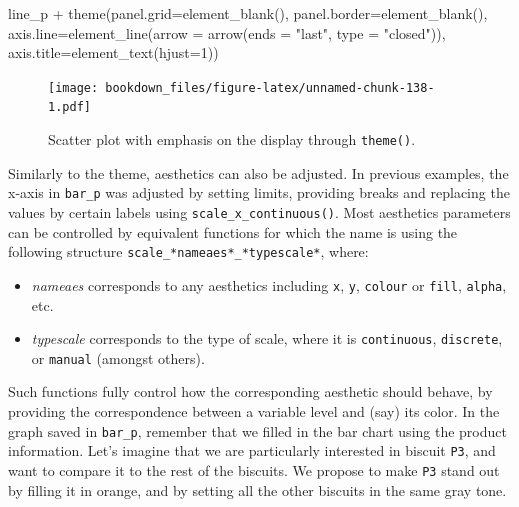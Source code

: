 \documentclass[
]{krantz}
\makeatletter
\newenvironment{Shaded}{\begin{snugshade}}{\end{snugshade}}
\newcommand{\AttributeTok}[1]{\textcolor[rgb]{0.61,0.61,0.61}{#1}}
\newcommand{\DecValTok}[1]{\textcolor[rgb]{0.06,0.06,0.06}{#1}}
\newcommand{\FunctionTok}[1]{\textcolor[rgb]{0,0,0}{#1}}
\newcommand{\NormalTok}[1]{#1}
\newcommand{\SpecialCharTok}[1]{\textcolor[rgb]{0,0,0}{#1}}
\newcommand{\StringTok}[1]{\textcolor[rgb]{0.5,0.5,0.5}{#1}}
\providecommand{\tightlist}{%
  \setlength{\itemsep}{0pt}\setlength{\parskip}{0pt}}
\newenvironment{kframe}{%
\medskip{}
\setlength{\fboxsep}{.8em}
 \def\at@end@of@kframe{}%
 \ifinner\ifhmode%
  \def\at@end@of@kframe{\end{minipage}}%
  \begin{minipage}{\columnwidth}%
 \fi\fi%
 \def\FrameCommand##1{\hskip\@totalleftmargin \hskip-\fboxsep
 \colorbox{shadecolor}{##1}\hskip-\fboxsep
     \hskip-\linewidth \hskip-\@totalleftmargin \hskip\columnwidth}%
 \MakeFramed {\advance\hsize-\width
   \@totalleftmargin\z@ \linewidth\hsize
   \@setminipage}}%
 {\par\unskip\endMakeFramed%
 \at@end@of@kframe}
\renewenvironment{Shaded}{\begin{kframe}}{\end{kframe}}
\makeatother
\begin{document}
\begin{Shaded}
\begin{Highlighting}[]
\NormalTok{line\_p }\SpecialCharTok{+}
  \FunctionTok{theme}\NormalTok{(}\AttributeTok{panel.grid=}\FunctionTok{element\_blank}\NormalTok{(), }
        \AttributeTok{panel.border=}\FunctionTok{element\_blank}\NormalTok{(),}
        \AttributeTok{axis.line=}\FunctionTok{element\_line}\NormalTok{(}\AttributeTok{arrow =} \FunctionTok{arrow}\NormalTok{(}\AttributeTok{ends =} \StringTok{"last"}\NormalTok{, }
                                             \AttributeTok{type =} \StringTok{"closed"}\NormalTok{)),}
        \AttributeTok{axis.title=}\FunctionTok{element\_text}\NormalTok{(}\AttributeTok{hjust=}\DecValTok{1}\NormalTok{))}
\end{Highlighting}
\end{Shaded}

\begin{figure}
\centering
\texttt{[image: bookdown\_files/figure-latex/unnamed-chunk-138-1.pdf]}
\caption{\label{fig:unnamed-chunk-138}Scatter plot with emphasis on the display through \texttt{theme()}.}
\end{figure}

Similarly to the theme, aesthetics can also be adjusted. In previous examples, the x-axis in \texttt{bar\_p} was adjusted by setting limits, providing breaks and replacing the values by certain labels using \texttt{scale\_x\_continuous()}.
Most aesthetics parameters can be controlled by equivalent functions for which the name is using the following structure \texttt{scale\_*nameaes*\_*typescale*}, where:

\begin{itemize}
\tightlist
\item
  \emph{nameaes} corresponds to any aesthetics including \texttt{x}, \texttt{y}, \texttt{colour} or \texttt{fill}, \texttt{alpha}, etc.
\item
  \emph{typescale} corresponds to the type of scale, where it is \texttt{continuous}, \texttt{discrete}, or \texttt{manual} (amongst others).
\end{itemize}

Such functions fully control how the corresponding aesthetic should behave, by providing the correspondence between a variable level and (say) its color.
In the graph saved in \texttt{bar\_p}, remember that we filled in the bar chart using the product information. Let's imagine that we are particularly interested in biscuit \texttt{P3}, and want to compare it to the rest of the biscuits. We propose to make \texttt{P3} stand out by filling it in orange, and by setting all the other biscuits in the same gray tone.
\end{document}
